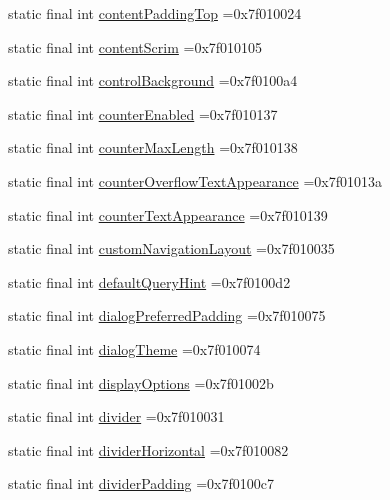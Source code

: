 \begin{DoxyCompactItemize}
\item 
static final int \hyperlink{classproject4_1_1xaria_1_1R_1_1attr_a4363552a9aa7bfc8f3fa883bb0de1fa1}{content\+Padding\+Top} =0x7f010024
\item 
static final int \hyperlink{classproject4_1_1xaria_1_1R_1_1attr_af20588b6e66abc96455fe0a66d44de43}{content\+Scrim} =0x7f010105
\item 
static final int \hyperlink{classproject4_1_1xaria_1_1R_1_1attr_a0378bff04031fc46fbbfef67270646dd}{control\+Background} =0x7f0100a4
\item 
static final int \hyperlink{classproject4_1_1xaria_1_1R_1_1attr_a33777063f9c08b789610e6cd15413c09}{counter\+Enabled} =0x7f010137
\item 
static final int \hyperlink{classproject4_1_1xaria_1_1R_1_1attr_acbad04a94c95d17047c4539e196c9457}{counter\+Max\+Length} =0x7f010138
\item 
static final int \hyperlink{classproject4_1_1xaria_1_1R_1_1attr_a11aecbe2c472f65bb1ae18a701957a0b}{counter\+Overflow\+Text\+Appearance} =0x7f01013a
\item 
static final int \hyperlink{classproject4_1_1xaria_1_1R_1_1attr_a641e752b5c342130e39a03b41a5c8d5f}{counter\+Text\+Appearance} =0x7f010139
\item 
static final int \hyperlink{classproject4_1_1xaria_1_1R_1_1attr_a89d381c5253acbcfebf892bf1e24d0c2}{custom\+Navigation\+Layout} =0x7f010035
\item 
static final int \hyperlink{classproject4_1_1xaria_1_1R_1_1attr_a7c6f196b7ed575f9a37173eacdc60512}{default\+Query\+Hint} =0x7f0100d2
\item 
static final int \hyperlink{classproject4_1_1xaria_1_1R_1_1attr_aad7863e1d64f1721a733f75862b6b91b}{dialog\+Preferred\+Padding} =0x7f010075
\item 
static final int \hyperlink{classproject4_1_1xaria_1_1R_1_1attr_ad2cbff1c880b3d8ab32154dd28810dfa}{dialog\+Theme} =0x7f010074
\item 
static final int \hyperlink{classproject4_1_1xaria_1_1R_1_1attr_a50707f742dca3b2c00f5db60fc71f8cb}{display\+Options} =0x7f01002b
\item 
static final int \hyperlink{classproject4_1_1xaria_1_1R_1_1attr_a9d49fad1327da769734c374cc8b100b9}{divider} =0x7f010031
\item 
static final int \hyperlink{classproject4_1_1xaria_1_1R_1_1attr_ada294fe68899372ef438a76fcd4ea867}{divider\+Horizontal} =0x7f010082
\item 
static final int \hyperlink{classproject4_1_1xaria_1_1R_1_1attr_a310c724258630e23cb9b834f4dad7154}{divider\+Padding} =0x7f0100c7

\end{DoxyCompactItemize}
